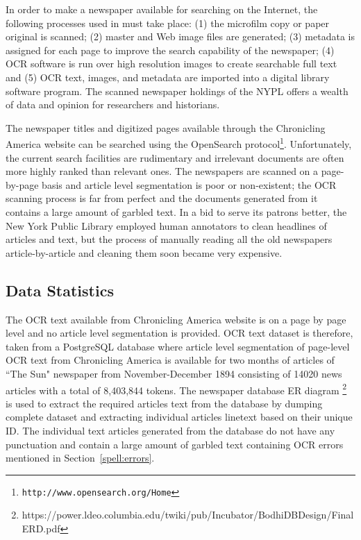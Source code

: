\documentclass[12pt]{article}
\begin{document}
In order to make a newspaper available for searching on the Internet,
the following processes used in \cite{dutta2011learning} must take place: (1) the microfilm copy or
paper original is scanned; (2) master and Web image files are
generated; (3) metadata is assigned for each page to improve the
search capability of the newspaper; (4) OCR software is run over high
resolution images to create searchable full text and (5) OCR text,
images, and metadata are imported into a digital library software
program. The scanned newspaper holdings of the NYPL offers a wealth of
data and opinion for researchers and historians.

The newspaper titles and digitized pages available through the
Chronicling America website can be searched using the OpenSearch
protocol\footnote{\texttt{http://www.opensearch.org/Home}}.
Unfortunately, the current search facilities are rudimentary and
irrelevant documents are often more highly ranked than relevant ones.
The newspapers are scanned on a page-by-page basis and article level
segmentation is poor or non-existent; the OCR scanning process is far
from perfect and the documents generated from it contains a large
amount of garbled text. In a bid to serve its patrons better, the New
York Public Library employed human annotators to clean headlines of
articles and text, but the process of manually reading all the old
newspapers article-by-article and cleaning them soon became very
expensive. 

\subsection{Data Statistics}
The OCR text available from Chronicling America website is on a page by page level and no article level segmentation is provided. OCR text dataset is therefore, taken from a PostgreSQL database where article level segmentation of page-level OCR text from Chronicling America is available for two months of articles of ``The Sun" newspaper from November-December 1894 consisting of 14020 news articles with a total of 8,403,844 tokens. The newspaper database ER diagram \footnote{https://power.ldeo.columbia.edu/twiki/pub/Incubator/BodhiDBDesign/Final ERD.pdf }
is used to extract the required articles text from the database by dumping complete dataset and extracting individual articles linetext based on their unique ID. The individual text articles generated from the database do not have any punctuation and contain a large amount of garbled text containing OCR errors mentioned in Section~\ref{spell:errors}.
\end{document}
